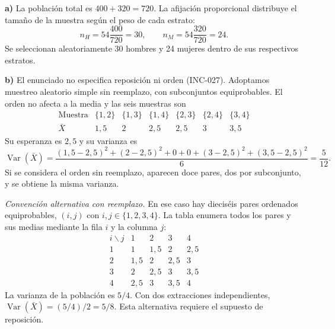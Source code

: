 \textbf{a)} La población total es $400+320=720$. La afijación proporcional distribuye el tamaño de la muestra según el peso de cada estrato:
\[
 n_H=54\frac{400}{720}=30,\qquad
 n_M=54\frac{320}{720}=24.
\]
Se seleccionan aleatoriamente 30 hombres y 24 mujeres dentro de sus respectivos estratos.

\textbf{b)} El enunciado no especifica reposición ni orden (INC-027). Adoptamos muestreo aleatorio simple sin reemplazo, con subconjuntos equiprobables. El orden no afecta a la media y las seis muestras son
\[
 \begin{array}{c|cccccc}
 \text{Muestra}&\{1,2\}&\{1,3\}&\{1,4\}&\{2,3\}&\{2,4\}&\{3,4\}\\
 \bar X&1{,}5&2&2{,}5&2{,}5&3&3{,}5
 \end{array}
\]
Su esperanza es $2{,}5$ y su varianza es
\[
 \operatorname{Var}(\bar X)
 =\frac{(1{,}5-2{,}5)^2+(2-2{,}5)^2+0+0+(3-2{,}5)^2+(3{,}5-2{,}5)^2}{6}
 =\boxed{\frac5{12}}.
\]
Si se considera el orden sin reemplazo, aparecen doce pares, dos por subconjunto, y se obtiene la misma varianza.

\textit{Convención alternativa con reemplazo.} En ese caso hay dieciséis pares ordenados equiprobables, $(i,j)$ con $i,j\in\{1,2,3,4\}$. La tabla enumera todos los pares y sus medias mediante la fila $i$ y la columna $j$:
\[
 \begin{array}{c|cccc}
 i\backslash j&1&2&3&4\\\hline
 1&1&1{,}5&2&2{,}5\\
 2&1{,}5&2&2{,}5&3\\
 3&2&2{,}5&3&3{,}5\\
 4&2{,}5&3&3{,}5&4
 \end{array}
\]
La varianza de la población es $5/4$. Con dos extracciones independientes, $\operatorname{Var}(\bar X)=(5/4)/2=\boxed{5/8}$. Esta alternativa requiere el supuesto de reposición.
